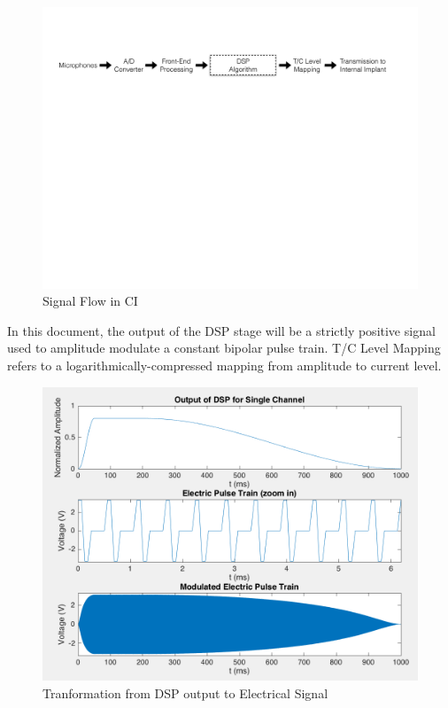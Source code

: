 \documentclass [11pt, proquest,oneside] {uwthesis}[2015/03/03]
\begin{document}
\begin{figure}[!ht]
  \centering
    \includegraphics[width=1.0\textwidth]{CI_Signal_Flow}   
    \caption{Signal Flow in CI}\label{fig:CI_signal_flow}
\end{figure}

In this document, the output of the DSP stage will be a strictly positive signal used to amplitude modulate a constant bipolar pulse train.  T/C Level Mapping refers to a logarithmically-compressed mapping from amplitude to current level.

\begin{figure}[!ht]
  \centering
    \includegraphics[width=1.0\textwidth]{output_of_dsp}   
    \caption{Tranformation from DSP output to Electrical Signal}\label{fig:output_of_dsp}
\end{figure}
\end{document}
